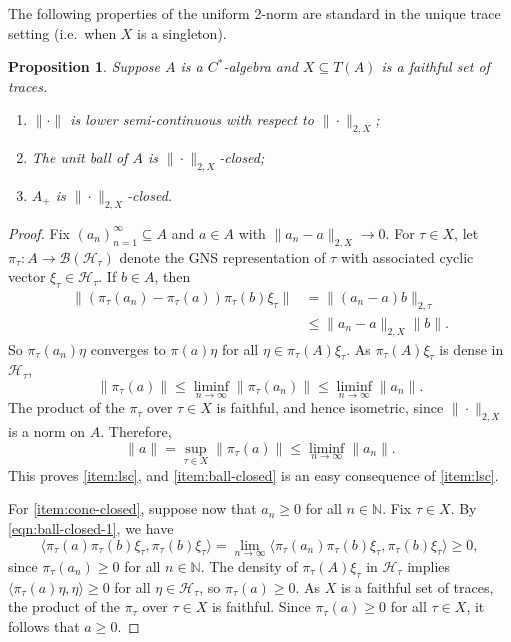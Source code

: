 \documentclass[a4paper,11pt]{amsart}
\newtheorem{proposition}[theorem]{Proposition}
\theoremstyle{definition}
\numberwithin{equation}{section}
\numberwithin{theorem}{section}
\newcommand{\N}{\mathbb N}
\begin{document}
The following properties of the uniform 2-norm are standard in the unique trace setting (i.e.\ when $X$ is a singleton).
\begin{proposition}\label{prop:ball-closed}
	Suppose $A$ is a $C^*$-algebra and $X \subseteq T(A)$ is a faithful set of traces.
	\begin{enumerate}
		\item\label{item:lsc} $\|\cdot\|$ is lower semi-continuous with respect to $\|\cdot\|_{2, X}$;
		\item\label{item:ball-closed} The unit ball of $A$ is $\|\cdot\|_{2, X}$-closed;
		\item\label{item:cone-closed} $A_+$ is $\|\cdot\|_{2, X}$-closed.
	\end{enumerate}
\end{proposition}
\begin{proof}
	Fix $(a_n)_{n=1}^\infty \subseteq A$ and $a \in A$ with $\|a_n - a\|_{2, X} \rightarrow 0$. 
	For $\tau \in X$, let $\pi_\tau \colon A \rightarrow \mathcal B(\mathcal H_\tau)$ denote the GNS representation of $\tau$ with associated cyclic vector $\xi_\tau \in \mathcal H_\tau$.  If $b \in A$, then 
	\begin{equation}\label{eqn:ball-closed-1}
\begin{split}
		\|(\pi_\tau(a_n) - \pi_\tau(a))\pi_\tau(b)\xi_\tau\| &= \|(a_n - a)b\|_{2,\tau} \\
		&\leq \|a_n-a\|_{2,X}\|b\|.
	\end{split}
\end{equation}	
	So $\pi_\tau(a_n)\eta$ converges to $\pi(a)\eta$ for all $\eta \in \pi_\tau(A)\xi_\tau$.  As $\pi_\tau(A)\xi_\tau$ is dense in $\mathcal H_\tau$,
	\begin{equation}
		\|\pi_\tau(a)\| \leq \liminf_{n \rightarrow \infty} \|\pi_\tau(a_n)\| \leq \liminf_{n \rightarrow \infty} \|a_n\|.
	\end{equation}
	 The product of the $\pi_\tau$ over $\tau \in X$ is faithful, and hence isometric, since $\|\cdot\|_{2, X}$ is a norm on $A$.  Therefore,
	\begin{equation}
		\|a\| = \sup_{\tau \in X} \|\pi_\tau(a)\| \leq \liminf_{n \rightarrow \infty} \|a_n\|.
	\end{equation}
This proves \ref{item:lsc}, and \ref{item:ball-closed} is an easy consequence of \ref{item:lsc}.

For \ref{item:cone-closed}, suppose now that $a_n \geq 0$ for all $n \in \N$.
Fix $\tau \in X$.
By \eqref{eqn:ball-closed-1}, we have 
	\begin{equation}
		\langle \pi_\tau(a)\pi_\tau(b)\xi_\tau, \pi_\tau(b)\xi_\tau \rangle = \lim_{n\to\infty} \langle \pi_\tau(a_n)\pi_\tau(b)\xi_\tau, \pi_\tau(b)\xi_\tau \rangle \geq 0,
	\end{equation}
	since $\pi_\tau(a_n) \geq 0$ for all $n \in \N$.
	The density of $\pi_\tau(A)\xi_\tau$ in $\mathcal H_\tau$ implies $\langle \pi_\tau(a)\eta,\eta \rangle \geq 0$ for all $\eta \in \mathcal H_\tau$, so $\pi_\tau(a) \geq 0$.
	As $X$ is a faithful set of traces, the product of the $\pi_\tau$ over $\tau \in X$ is faithful. 
	Since $\pi_\tau(a) \geq 0$ for all $\tau \in X$, it follows that $a \geq 0$.	
\end{proof}
\end{document}
